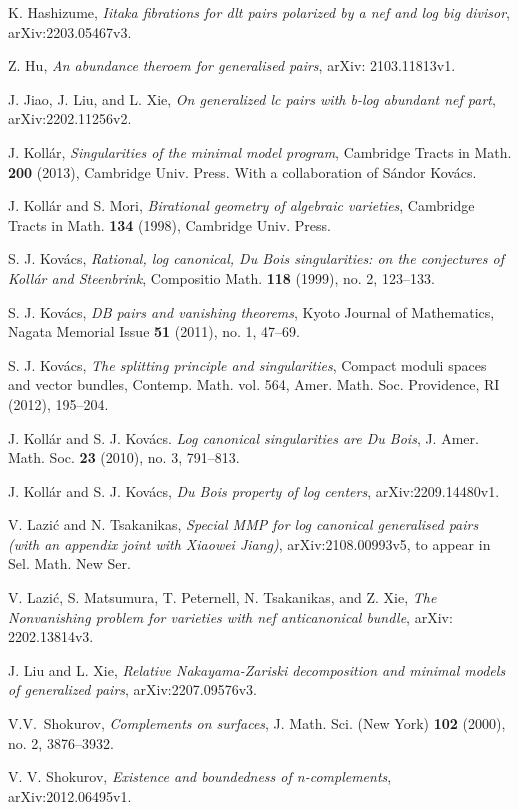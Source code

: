 \documentclass[11pt]{amsart}
\numberwithin{equation}{section}
\theoremstyle{definition}
\theoremstyle{definition}
\theoremstyle{definition}
\begin{document}
\begin{thebibliography}{ABCDE}
 K. Hashizume, \textit{Iitaka fibrations for dlt pairs polarized by a nef and log big divisor}, arXiv:2203.05467v3.

 Z. Hu, \textit{An abundance theroem for generalised pairs}, arXiv: 2103.11813v1.


 J. Jiao, J. Liu, and L. Xie, \textit{On generalized lc pairs with b-log abundant nef part}, arXiv:2202.11256v2.


 J. Koll\'ar, \textit{Singularities of the minimal model program}, Cambridge Tracts in Math. \textbf{200} (2013), Cambridge Univ. Press. With a collaboration of S\'andor Kov\'acs.



 J. Koll\'{a}r and S. Mori, \textit{Birational geometry of algebraic varieties}, Cambridge Tracts in Math. \textbf{134} (1998), Cambridge Univ. Press.

 S. J. Kov\'acs, \textit{Rational, log canonical, Du Bois singularities: on the conjectures of Koll\'ar and Steenbrink}, Compositio Math. \textbf{118} (1999), no. 2, 123--133.

 S. J. Kov\'acs, \textit{DB pairs and vanishing theorems}, Kyoto Journal of Mathematics, Nagata Memorial Issue \textbf{51} (2011), no. 1, 47--69.

 S. J. Kov\'acs, \textit{The splitting principle and singularities}, Compact moduli spaces and vector bundles, Contemp. Math. vol. 564, Amer. Math. Soc. Providence, RI (2012), 195--204.

 J. Koll\'ar and S. J. Kov\'acs. \textit{Log canonical singularities are Du Bois}, J. Amer. Math. Soc. \textbf{23}  (2010), no. 3, 791--813.

 J. Koll\'ar and S. J. Kov\'acs, \textit{Du Bois property of log centers}, arXiv:2209.14480v1.

 V. Lazi\'c and N. Tsakanikas, \textit{Special MMP for log canonical generalised pairs (with an appendix joint with Xiaowei Jiang)}, arXiv:2108.00993v5, to appear in Sel. Math. New Ser.

 V. Lazi\'c, S. Matsumura, T. Peternell, N. Tsakanikas, and Z. Xie, \textit{The Nonvanishing problem for varieties with nef anticanonical bundle}, arXiv: 2202.13814v3.

 J. Liu and L. Xie, \textit{Relative Nakayama-Zariski decomposition and minimal models of generalized pairs}, arXiv:2207.09576v3.

 V.V.~Shokurov, \textit{Complements on surfaces}, J. Math. Sci. (New York) \textbf{102} (2000), no. 2, 3876--3932.

 V. V. Shokurov, \textit{Existence and boundedness of n-complements}, arXiv:2012.06495v1.
\end{thebibliography}
\end{document}
